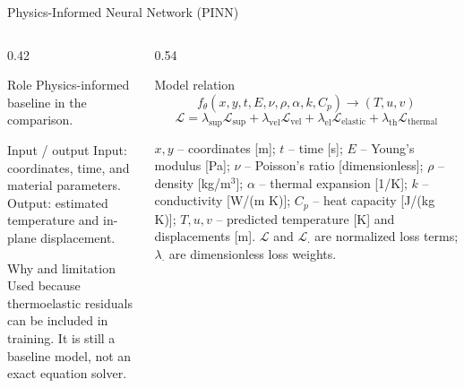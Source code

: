 \documentclass[aspectratio=169,10pt]{beamer}
\begin{document}
\begin{frame}{Physics-Informed Neural Network (PINN)}
  \begin{columns}[T]
    \begin{column}{0.42\textwidth}
      \footnotesize
      \begin{block}{Role}
        Physics-informed baseline in the comparison.
      \end{block}
      \begin{block}{Input / output}
        Input: coordinates, time, and material parameters.
        Output: estimated temperature and in-plane displacement.
      \end{block}
      \begin{block}{Why and limitation}
        Used because thermoelastic residuals can be included in training.
        It is still a baseline model, not an exact equation solver.
      \end{block}
    \end{column}
    \begin{column}{0.54\textwidth}
      \begin{block}{Model relation}
        \[
          f_{\theta}(x,y,t,E,\nu,\rho,\alpha,k,C_p)\rightarrow(T,u,v)
        \]
        \[
          \mathcal{L}
          =
          \lambda_{\mathrm{sup}}\mathcal{L}_{\mathrm{sup}}
          +
          \lambda_{\mathrm{vel}}\mathcal{L}_{\mathrm{vel}}
          +
          \lambda_{\mathrm{el}}\mathcal{L}_{\mathrm{elastic}}
          +
          \lambda_{\mathrm{th}}\mathcal{L}_{\mathrm{thermal}}
        \]
      \end{block}
      \scriptsize
      $x,y$ -- coordinates [m]; $t$ -- time [s]; $E$ -- Young's modulus [Pa];
      $\nu$ -- Poisson's ratio [dimensionless]; $\rho$ -- density [kg/m$^3$];
      $\alpha$ -- thermal expansion [1/K]; $k$ -- conductivity [W/(m K)];
      $C_p$ -- heat capacity [J/(kg K)]; $T,u,v$ -- predicted temperature [K]
      and displacements [m]. $\mathcal{L}$ and $\mathcal{L}_{\cdot}$ are
      normalized loss terms; $\lambda_{\cdot}$ are dimensionless loss weights.
    \end{column}
  \end{columns}
\end{frame}
\end{document}
